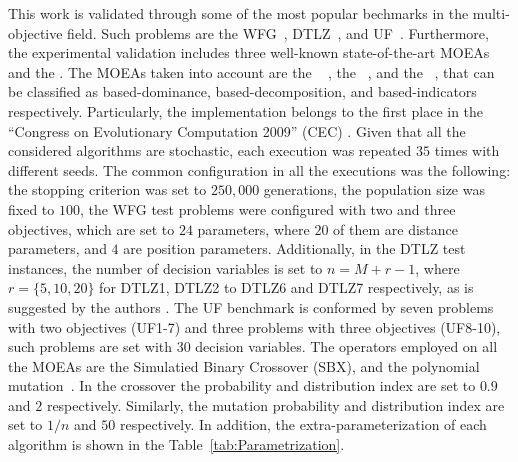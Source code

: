 This work is validated through some of the most popular bechmarks in the multi-objective field.
%
Such problems are the WFG~\cite{Joel:WFG}, DTLZ~\cite{Joel:DTLZ}, and UF~\cite{Joel:CEC2009}.
%
Furthermore, the experimental validation includes three well-known state-of-the-art MOEAs and the \VSDMOEA{}.
%
The MOEAs taken into account are the \NSGAII{}~\cite{Joel:jMetal} , the \MOEAD{}~\cite{MOEADCode}, and the \RMOEA{}~\cite{R2EMOACode}, that can be classified as based-dominance, based-decomposition, and based-indicators respectively.
%
Particularly, the \MOEAD{} implementation belongs to the first place in the ``Congress on Evolutionary Computation 2009'' (CEC) \cite{zhang2009performance}.
%
Given that all the considered algorithms are stochastic, each execution was repeated $35$ times with different seeds.
%
The common configuration in all the executions was the following: the stopping criterion was set to $250,000$ generations, the population size was fixed to $100$, the WFG test problems were configured with two and three objectives, which are set to $24$ parameters, where $20$ of them are distance parameters, and $4$ are position parameters.
%
Additionally, in the DTLZ test instances, the number of decision variables is set to $n=M+r-1$, where $r=\{5, 10, 20\}$ for DTLZ1, DTLZ2 to DTLZ6 and DTLZ7 respectively, as is suggested by the authors \cite{Joel:DTLZ}.  
% 
The UF benchmark is conformed by seven problems with two objectives (UF1-7) and three problems with three objectives (UF8-10), such problems are set with $30$ decision variables.
%
The operators employed on all the MOEAs are the Simulatied Binary Crossover (SBX), and the polynomial mutation~\cite{Joel:SBX1994, Joel:Mutation}.
%
In the crossover the probability and distribution index are set to $0.9$ and $2$ respectively.
%
Similarly, the mutation probability and distribution index are set to $1/n$ and $50$ respectively.
%
%
%
%
%
In addition, the extra-parameterization of each algorithm is shown in the Table~\ref{tab:Parametrization}.


